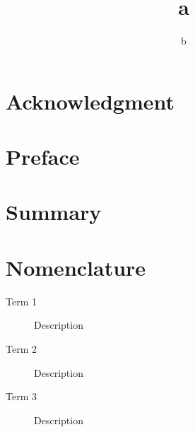 \documentclass[pdf,12pt,report,strict]{SANDreport}
\title{a}
\author{b}          %
\date{}             %
\begin{document}
    \maketitle

    \begin{abstract}
    \end{abstract}


    \clearpage
    \chapter*{Acknowledgment}


    \cleardoublepage            %
    \tableofcontents
    \listoffigures
    \listoftables


    \clearpage
    \chapter*{Preface}


    \clearpage
    \chapter*{Summary}


    \clearpage
    \chapter*{Nomenclature}
    \begin{description}
        \item[Term 1]
            Description
        \item[Term 2]
            Description
        \item[Term 3]
            Description
    \end{description}
\end{document}
